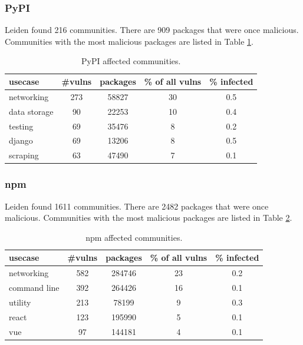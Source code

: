 \documentclass[9pt,twocolumn,twoside]{pnas-report}
\begin{document}
\subsubsection*{PyPI}
Leiden found 216 communities. There are 909 packages that were once malicious. Communities with the most malicious packages are listed in Table \ref{tab:pypi_comms}.
\begin{table}[h]\centering%
	\caption{PyPI affected communities.}
	\begin{tabular}{l|cccc}
		usecase      & \#vulns & packages & \% of all vulns & \% infected \\\hline
		networking   & 273     & 58827    & 30              & 0.5         \\
		data storage & 90      & 22253    & 10              & 0.4         \\
		testing      & 69      & 35476    & 8               & 0.2         \\
		django       & 69      & 13206    & 8               & 0.5         \\
		scraping     & 63      & 47490    & 7               & 0.1         \\
	\end{tabular}
	\label{tab:pypi_comms}
\end{table}

\subsubsection*{npm}
Leiden found 1611 communities. There are 2482 packages that were once malicious. Communities with the most malicious packages are listed in Table \ref{tab:npm_comms}.
\begin{table}[h]\centering%
	\caption{npm affected communities.}
	\begin{tabular}{l|cccc}
		usecase      & \#vulns & packages & \% of all vulns & \% infected \\\hline
		networking   & 582     & 284746   & 23              & 0.2         \\
		command line & 392     & 264426   & 16              & 0.1         \\
		utility      & 213     & 78199    & 9               & 0.3         \\
		react        & 123     & 195990   & 5               & 0.1         \\
		vue          & 97      & 144181   & 4               & 0.1         \\
	\end{tabular}
	\label{tab:npm_comms}
\end{table}
\end{document}
